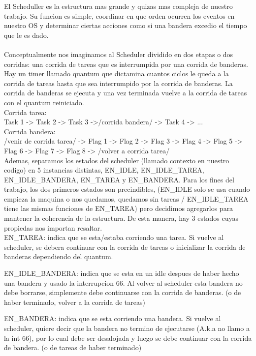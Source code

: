 El Scheduller es la estructura mas grande y quizas mas compleja de nuestro trabajo. Su funcion es simple, coordinar en 
que orden ocurren los eventos en nuestro OS y determinar ciertas acciones como si una bandera excedio el tiempo que le es dado.\\
\\
Conceptualmente nos imaginamos al Scheduler dividido en dos etapas o dos corridas: una corrida de tareas que es interrumpida por una corrida de banderas.
Hay un timer llamado quantum que dictamina cuantos ciclos le queda a la corrida de tareas hasta que sea interrumpido por la corrida de banderas.
La corrida de banderas se ejecuta y una vez terminada vuelve a la corrida de tareas con el quantum reiniciado.
\\
Corrida tarea:
\\
Task 1 -> Task 2 -> Task  3 ->/corrida bandera/ -> Task 4 -> ...
\\
Corrida bandera:
\\
/venir de corrida tarea/ -> Flag 1 -> Flag 2 -> Flag 3 -> Flag 4 -> Flag 5 -> Flag 6 -> Flag 7 -> Flag 8 -> /volver a corrida tarea/
\\
Ademas, separamos los estados del scheduler (llamado contexto en nuestro codigo) en 5 instancias distintas, EN_IDLE, EN_IDLE_TAREA, EN_IDLE_BANDERA, 
EN_TAREA y EN_BANDERA. Para los fines del trabajo, los dos primeros estados son precindibles, (EN_IDLE solo se usa cuando empieza la maquina o nos quedamos,
quedamos sin tareas / EN_IDLE_TAREA tiene las mismas funciones de EN_TAREA) pero decidimos agregarlos para mantener la coherencia de la estructura. De esta 
manera, hay 3 estados cuyas propiedas nos importan resaltar.
\\
EN_TAREA: indica que se esta/estaba corriendo una tarea. Si vuelve al scheduler, se debera continuar con la corrida de tareas o inicializar la corrida de banderas 
dependiendo del quantum.

EN_IDLE_BANDERA: indica que se esta en un idle despues de haber hecho una bandera y usado la interrupcion 66. Al volver al scheduler esta bandera no debe borrarse,
simplemente debe continuarse con la corrida de banderas. (o de haber terminado, volver a la corrida de tareas)

EN_BANDERA: indica que se esta corriendo una bandera. Si vuelve al scheduler, quiere decir que la bandera no termino de ejecutarse (A.k.a no llamo a la int 66), por lo cual 
debe ser desalojada y luego se debe continuar con la corrida de bandera. (o de tareas de haber terminado)

